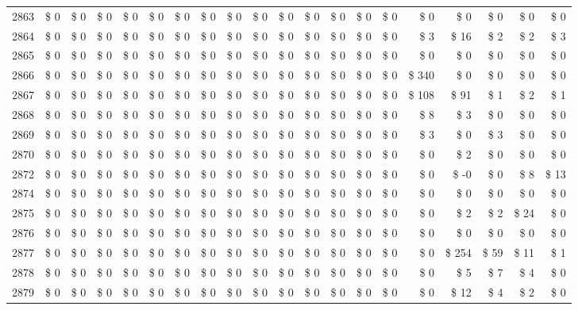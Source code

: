 \begin{longtable}{lrrrrrrrrrrrrrrrrrrr}
2863 & \$ 0 & \$ 0 & \$ 0 & \$ 0 & \$ 0 & \$ 0 & \$ 0 & \$ 0 & \$ 0 & \$ 0 & \$ 0 & \$ 0 & \$ 0 & \$ 0 & \$ 0 & \$ 0 & \$ 0 & \$ 0 & \$ 0 \\
2864 & \$ 0 & \$ 0 & \$ 0 & \$ 0 & \$ 0 & \$ 0 & \$ 0 & \$ 0 & \$ 0 & \$ 0 & \$ 0 & \$ 0 & \$ 0 & \$ 0 & \$ 3 & \$ 16 & \$ 2 & \$ 2 & \$ 3 \\
2865 & \$ 0 & \$ 0 & \$ 0 & \$ 0 & \$ 0 & \$ 0 & \$ 0 & \$ 0 & \$ 0 & \$ 0 & \$ 0 & \$ 0 & \$ 0 & \$ 0 & \$ 0 & \$ 0 & \$ 0 & \$ 0 & \$ 0 \\
2866 & \$ 0 & \$ 0 & \$ 0 & \$ 0 & \$ 0 & \$ 0 & \$ 0 & \$ 0 & \$ 0 & \$ 0 & \$ 0 & \$ 0 & \$ 0 & \$ 0 & \$ 340 & \$ 0 & \$ 0 & \$ 0 & \$ 0 \\
2867 & \$ 0 & \$ 0 & \$ 0 & \$ 0 & \$ 0 & \$ 0 & \$ 0 & \$ 0 & \$ 0 & \$ 0 & \$ 0 & \$ 0 & \$ 0 & \$ 0 & \$ 108 & \$ 91 & \$ 1 & \$ 2 & \$ 1 \\
2868 & \$ 0 & \$ 0 & \$ 0 & \$ 0 & \$ 0 & \$ 0 & \$ 0 & \$ 0 & \$ 0 & \$ 0 & \$ 0 & \$ 0 & \$ 0 & \$ 0 & \$ 8 & \$ 3 & \$ 0 & \$ 0 & \$ 0 \\
2869 & \$ 0 & \$ 0 & \$ 0 & \$ 0 & \$ 0 & \$ 0 & \$ 0 & \$ 0 & \$ 0 & \$ 0 & \$ 0 & \$ 0 & \$ 0 & \$ 0 & \$ 3 & \$ 0 & \$ 3 & \$ 0 & \$ 0 \\
2870 & \$ 0 & \$ 0 & \$ 0 & \$ 0 & \$ 0 & \$ 0 & \$ 0 & \$ 0 & \$ 0 & \$ 0 & \$ 0 & \$ 0 & \$ 0 & \$ 0 & \$ 0 & \$ 2 & \$ 0 & \$ 0 & \$ 0 \\
2872 & \$ 0 & \$ 0 & \$ 0 & \$ 0 & \$ 0 & \$ 0 & \$ 0 & \$ 0 & \$ 0 & \$ 0 & \$ 0 & \$ 0 & \$ 0 & \$ 0 & \$ 0 & \$ -0 & \$ 0 & \$ 8 & \$ 13 \\
2874 & \$ 0 & \$ 0 & \$ 0 & \$ 0 & \$ 0 & \$ 0 & \$ 0 & \$ 0 & \$ 0 & \$ 0 & \$ 0 & \$ 0 & \$ 0 & \$ 0 & \$ 0 & \$ 0 & \$ 0 & \$ 0 & \$ 0 \\
2875 & \$ 0 & \$ 0 & \$ 0 & \$ 0 & \$ 0 & \$ 0 & \$ 0 & \$ 0 & \$ 0 & \$ 0 & \$ 0 & \$ 0 & \$ 0 & \$ 0 & \$ 0 & \$ 2 & \$ 2 & \$ 24 & \$ 0 \\
2876 & \$ 0 & \$ 0 & \$ 0 & \$ 0 & \$ 0 & \$ 0 & \$ 0 & \$ 0 & \$ 0 & \$ 0 & \$ 0 & \$ 0 & \$ 0 & \$ 0 & \$ 0 & \$ 0 & \$ 0 & \$ 0 & \$ 0 \\
2877 & \$ 0 & \$ 0 & \$ 0 & \$ 0 & \$ 0 & \$ 0 & \$ 0 & \$ 0 & \$ 0 & \$ 0 & \$ 0 & \$ 0 & \$ 0 & \$ 0 & \$ 0 & \$ 254 & \$ 59 & \$ 11 & \$ 1 \\
2878 & \$ 0 & \$ 0 & \$ 0 & \$ 0 & \$ 0 & \$ 0 & \$ 0 & \$ 0 & \$ 0 & \$ 0 & \$ 0 & \$ 0 & \$ 0 & \$ 0 & \$ 0 & \$ 5 & \$ 7 & \$ 4 & \$ 0 \\
2879 & \$ 0 & \$ 0 & \$ 0 & \$ 0 & \$ 0 & \$ 0 & \$ 0 & \$ 0 & \$ 0 & \$ 0 & \$ 0 & \$ 0 & \$ 0 & \$ 0 & \$ 0 & \$ 12 & \$ 4 & \$ 2 & \$ 0 \\

\end{longtable}
